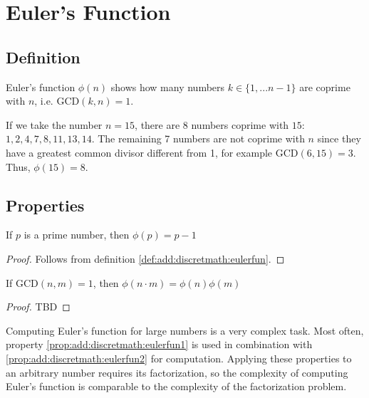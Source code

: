 \section{Euler's Function}

\subsection{Definition}
\begin{definition}
Euler's function $\phi\left(n\right)$ shows how many numbers $k \in
\{1, ... n-1\}$ are coprime with $n$, i.e. $\mbox{GCD}\left(k,
n\right) = 1$.
\label{def:add:discretmath:eulerfun}
\end{definition}

\begin{example}
  If we take the number $n=15$, there are 8 numbers coprime with $15$: 
  $1, 2, 4, 7, 8, 11, 13, 14$. The remaining 7 numbers are not coprime
  with $n$ since they have a greatest common divisor different
  from 1, for example $\mbox{GCD}\left(6, 15\right) = 3$.
  Thus, $\phi\left(15\right) = 8$. 
\end{example}

\subsection{Properties}

\begin{property}
If $p$ is a prime number, then $\phi(p) = p - 1$
\begin{proof}
Follows from definition \ref{def:add:discretmath:eulerfun}.
\end{proof}
\label{prop:add:discretmath:eulerfun1}
\end{property}


\begin{property}
If $\mbox{GCD}\left(n, m\right) = 1$, then
$\phi\left(n \cdot m\right) = \phi\left(n\right) \phi\left( m\right)$
\begin{proof}
TBD
\end{proof}
\label{prop:add:discretmath:eulerfun2}
\end{property}

\begin{remark}
\label{rem:add:discretmath:eulerfuncomplex}
Computing Euler's function for large numbers is a very complex
task. Most often, property
\ref{prop:add:discretmath:eulerfun1} is used in combination with
\ref{prop:add:discretmath:eulerfun2} for computation. Applying these properties to
an arbitrary number requires its factorization, so the complexity
of computing Euler's function is comparable to the complexity of the factorization problem. 
\end{remark}